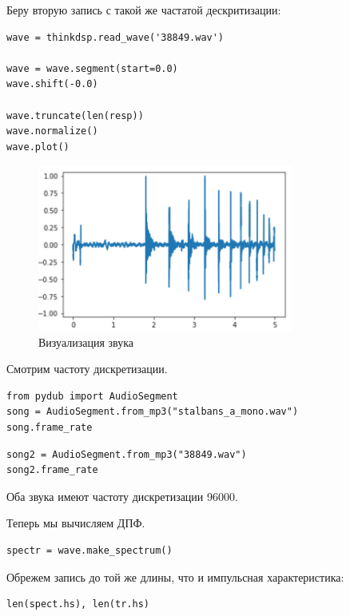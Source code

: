 \documentclass[a4paper,12pt]{report}
\begin{document}
Беру вторую запись с такой же частатой дескритизации:

\begin{lstlisting}[caption=Загрузка звука]
wave = thinkdsp.read_wave('38849.wav')

wave = wave.segment(start=0.0)
wave.shift(-0.0)

wave.truncate(len(resp))
wave.normalize()
wave.plot()
\end{lstlisting}

\begin{figure}[H]
        \centering
        \includegraphics[width=0.75\textwidth]{12.png}
        \caption{Визуализация звука}
        \label{12}
\end{figure}

Смотрим частоту дискретизации.

\begin{lstlisting}[caption=Частота дискретизации 1]
from pydub import AudioSegment
song = AudioSegment.from_mp3("stalbans_a_mono.wav")
song.frame_rate
\end{lstlisting}

\begin{lstlisting}[caption=Частота дискретизации 2]
song2 = AudioSegment.from_mp3("38849.wav")
song2.frame_rate
\end{lstlisting}

Оба звука имеют частоту дискретизации 96000.

Теперь мы вычисляем ДПФ.

\begin{lstlisting}[caption=Спектр звука]
spectr = wave.make_spectrum()
\end{lstlisting}

Обрежем запись до той же длины, что и импульсная характеристика:

\begin{lstlisting}[caption=Длина записей]
len(spect.hs), len(tr.hs)
\end{lstlisting}
\end{document}
